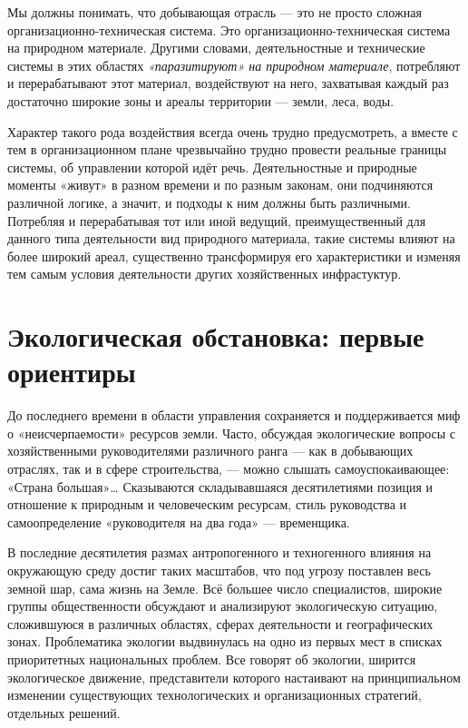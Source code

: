 \documentclass[11pt,a4paper]{article}
\begin{document}
Мы должны понимать, что добывающая отрасль — это не просто сложная
организацион\-но-техническая система. Это организационно-техническая система на
природном материале. Другими словами, деятельностные и технические системы в
этих областях \emph{«паразитируют» на природном материале}, потребляют и
перерабатывают этот материал, воздействуют на него, захватывая каждый раз
достаточно широкие зоны и ареалы территории — земли, леса, воды. 

Характер такого рода воздействия всегда очень трудно предусмотреть, а вместе с
тем в организационном плане чрезвычайно трудно провести реальные границы
системы, об управлении которой идёт речь. Деятельностные и природные моменты
«живут» в разном времени и по разным законам, они подчиняются различной
логике, а значит, и подходы к ним должны быть различными. Потребляя и
перерабатывая тот или иной ведущий, преимущественный для данного типа
деятельности вид природного материала, такие системы влияют на более широкий
ареал, существенно трансформируя его характеристики и изменяя тем самым
условия деятельности других хозяйственных инфрастуктур.

\section{Экологическая обстановка: первые ориентиры}

До последнего времени в области управления сохраняется и поддерживается миф о
«неисчерпаемости» ресурсов земли. Часто, обсуждая экологические вопросы с
хозяйственными руководителями различного ранга — как в добывающих отраслях,
так и в сфере строительства, — можно слышать самоуспокаивающее: «Страна
большая»… Сказываются складывавшаяся десятилетиями позиция и отношение к
природным и человеческим ресурсам, стиль руководства и самоопределение
«руководителя на два года» — временщика.

В последние десятилетия размах антропогенного и техногенного влияния на
окружающую среду достиг таких масштабов, что под угрозу поставлен весь земной
шар, сама жизнь на Земле. Всё большее число специалистов, широкие группы
общественности обсуждают и анализируют экологическую ситуацию, сложившуюся в
различных областях, сферах деятельности и географических зонах. Проблематика
экологии выдвинулась на одно из первых мест в списках приоритетных
национальных проблем. Все говорят об экологии, ширится экологическое движение,
представители которого настаивают на принципиальном изменении существующих
технологических и организационных стратегий, отдельных решений. 
\end{document}
